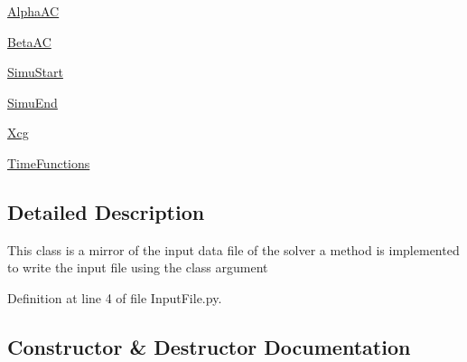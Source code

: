 \begin{DoxyCompactItemize}
\item 
\hyperlink{classgebtaero_1_1_input_file_1_1_input_file_a1bf2ed2352dca0749990cccb737fef5a}{Alpha\+AC}
\item 
\hyperlink{classgebtaero_1_1_input_file_1_1_input_file_a20868cef3eeb8d6c140d62d2d2252657}{Beta\+AC}
\item 
\hyperlink{classgebtaero_1_1_input_file_1_1_input_file_a76efb85d94155e3065ed0139ee3adc5f}{Simu\+Start}
\item 
\hyperlink{classgebtaero_1_1_input_file_1_1_input_file_a94164f915c41a24c95ad025f34b7cbcc}{Simu\+End}
\item 
\hyperlink{classgebtaero_1_1_input_file_1_1_input_file_a3e49397db5d15285d57c3df5311bf2f8}{Xcg}
\item 
\hyperlink{classgebtaero_1_1_input_file_1_1_input_file_a8e5da9f59ecc39d20885bf47fca12382}{Time\+Functions}
\end{DoxyCompactItemize}


\subsection{Detailed Description}
\begin{DoxyVerb}This class is a mirror of the input data file of the solver
a method is implemented to write the input file using the class argument
\end{DoxyVerb}
 

Definition at line 4 of file Input\+File.\+py.



\subsection{Constructor \& Destructor Documentation}
\mbox{\label{classgebtaero_1_1_input_file_1_1_input_file_ab2b0171273e5341d432bc98b59208afd}} 
